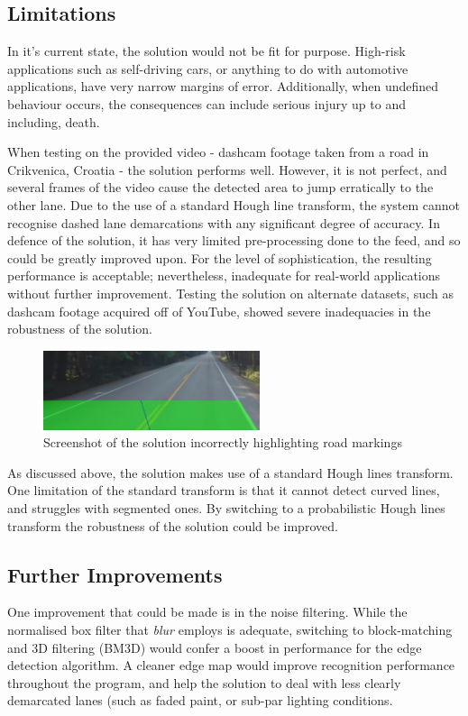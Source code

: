 \documentclass[conference]{IEEEtran}
\begin{document}
\subsection{Limitations}\label{sec:t2_lim}
In it's current state, the solution would not be fit for purpose. High-risk applications such as self-driving cars, or anything to do with automotive applications, have very narrow margins of error. Additionally, when undefined behaviour occurs, the consequences can include serious injury up to and including, death.

When testing on the provided video - dashcam footage taken from a road in Crikvenica, Croatia - the solution performs well. However, it is not perfect, and several frames of the video cause the detected area to jump erratically to the other lane. Due to the use of a standard Hough line transform, the system cannot recognise dashed lane demarcations with any significant degree of accuracy. In defence of the solution, it has very limited pre-processing done to the feed, and so could be greatly improved upon. For the level of sophistication, the resulting performance is acceptable; nevertheless, inadequate for real-world applications without further improvement. Testing the solution on alternate datasets, such as dashcam footage acquired off of YouTube\cite{SecondVideo}, showed severe inadequacies in the robustness of the solution.

\begin{figure}[H]
\centering
\includegraphics[width=2.5in]{video2_screenshot}
\caption{Screenshot of the solution incorrectly highlighting road markings}
\label{fig:t5working}
\end{figure}

As discussed above, the solution makes use of a standard Hough lines transform. One limitation of the standard transform is that it cannot detect curved lines, and struggles with segmented ones. By switching to a probabilistic Hough lines transform the robustness of the solution could be improved.
\subsection{Further Improvements}
One improvement that could be made is in the noise filtering. While the normalised box filter that \textit{blur} employs is adequate, switching to block-matching and 3D filtering (BM3D) would confer a boost in performance for the edge detection algorithm\cite{Blur}. A cleaner edge map would improve recognition performance throughout the program, and help the solution to deal with less clearly demarcated lanes (such as faded paint, or sub-par lighting conditions.
\end{document}

